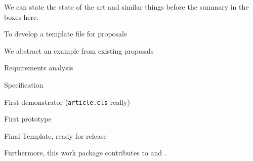 \begin{workpackage}[id=temple,type=DEM,lead=bar,
  wphases=6-12!1,
  title={\pn} Proposal Template,short=Template,barRM=6,bazRM=6]
We can state the state of the art and similar things before the summary in the boxes
here. 
\wpheadertable

\begin{wpobjectives}
  To develop a template file for {\pn} proposals
\end{wpobjectives}

\begin{wpdescription}
  We abstract an example from existing proposals
\end{wpdescription}

\begin{wpdelivs}
  \begin{wpdeliv}[due=6,id=req,nature=R,dissem=PP,miles=kickoff]
    {Requirements analysis}
  \end{wpdeliv}
  \begin{wpdeliv}[due=12,id=spec,nature=R,dissem=PU,miles=consensus]
    {{\pn} Specification }
  \end{wpdeliv}
  \begin{wpdeliv}[due=18,id=demonstrator,nature=D,dissem=PU,miles={consensus,final}]
    {First demonstrator ({\tt{article.cls}} really)}
  \end{wpdeliv}
  \begin{wpdeliv}[due=24,id=proto,nature=P,dissem=PU,miles=final]
    {First prototype}
  \end{wpdeliv}
  \begin{wpdeliv}[due=36,id=release,nature=P,dissem=PU,miles=final]
    {Final Template, ready for release}
  \end{wpdeliv}
\end{wpdelivs}
Furthermore, this work package contributes to {} and
{}.
\end{workpackage}


